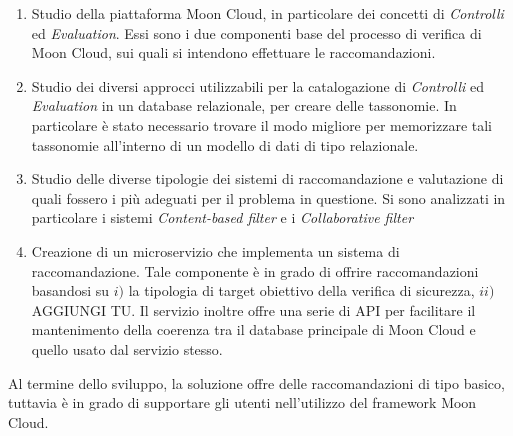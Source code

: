 \documentclass[10pt,a4paper]{article}
\begin{document}
\begin{enumerate}
    \item Studio della piattaforma Moon Cloud, in particolare dei concetti di \textit{Controlli} ed \textit{Evaluation}.
    Essi sono i due componenti base del processo di verifica di Moon Cloud, sui quali si intendono effettuare le raccomandazioni.
    \item Studio dei diversi approcci utilizzabili per la catalogazione di \textit{Controlli} ed \textit{Evaluation} in un database
    relazionale, per creare delle tassonomie. In particolare è stato necessario trovare il modo migliore per memorizzare tali tassonomie all'interno
    di un modello di dati di tipo relazionale.
    \item Studio delle diverse tipologie dei sistemi di raccomandazione e valutazione di quali fossero i più adeguati per il problema in questione.
    Si sono analizzati in particolare i sistemi \textit{Content-based filter} e i \textit{Collaborative filter} %
    \item Creazione di un microservizio che implementa un sistema di raccomandazione. Tale componente è in grado di offrire raccomandazioni basandosi
    su $i)$ la tipologia di target obiettivo della verifica di sicurezza, $ii)$ AGGIUNGI TU.
    Il servizio inoltre offre una serie di API per facilitare il mantenimento della coerenza tra il database principale di Moon Cloud e quello
    usato dal servizio stesso.
\end{enumerate}
%
Al termine dello sviluppo, la soluzione offre delle raccomandazioni di tipo basico, tuttavia è in grado di supportare gli utenti nell'utilizzo del framework 
Moon Cloud.
\end{document}
